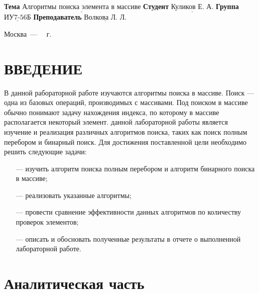 \documentclass{bmstu}
\begin{document}
\begin{titlepage}
	\noindent\textbf{Тема} 			$\underline{\text{Алгоритмы поиска элемента в массиве}}$\newline\newline
	\noindent\textbf{Студент} 		$\underline{\text{Куликов Е. А.}}$\newline\newline
	\noindent\textbf{Группа} 		$\underline{\text{ИУ7-56Б}}$\newline\newline
	\noindent\textbf{Преподаватель} $\underline{\text{Волкова Л. Л.}}$\newline

	\begin{center}
		\vfill
		Москва~---~\the\year
		~г.
	\end{center}
	\restoregeometry
\end{titlepage}

\renewcommand{\contentsname}{СОДЕРЖАНИЕ}
\tableofcontents
\setcounter{page}{2}

\chapter*{ВВЕДЕНИЕ}

В данной рабораторной работе изучаются алгоритмы поиска в массиве.
Поиск --- одна из базовых операций, производимых с массивами. Под поиском в массиве обычно понимают задачу нахождения индекса, по которому в массиве располагается некоторый элемент.
 данной лабораторной работы является изучение и реализация различных алгоритмов поиска, таких как поиск полным перебором и бинарный поиск.
Для достижения поставленной цели необходимо решить следующие задачи:

\begin{itemize}
	\item[---] изучить алгоритм поиска полным перебором и алгоритм бинарного поиска в массиве;
	\item[---] реализовать указанные алгоритмы;
	\item[---] провести сравнение эффективности данных алгоритмов по количеству проверок элементов;
        \item[---] описать и обосновать полученные результаты в отчете о выполненной лабораторной работе.
\end{itemize}


\chapter{Аналитическая часть}
\end{document}
